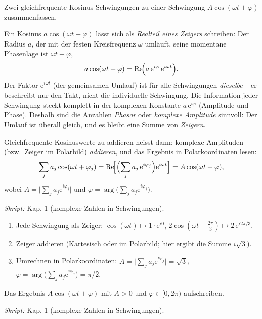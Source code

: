 

Zwei gleichfrequente Kosinus-Schwingungen zu einer Schwingung
$A\cos(\omega t+\varphi)$ zusammenfassen.

\begin{werkzeugkasten}
Ein Kosinus $a\cos(\omega t+\varphi)$ lässt sich als \emph{Realteil eines
Zeigers} schreiben: Der Radius $a$, der mit der festen Kreisfrequenz
$\omega$ umläuft, seine momentane Phasenlage ist $\omega t+\varphi$,
\begin{equation*}
  a\cos(\omega t+\varphi)
  =\operatorname{Re}\!\Bigl(a\,\mathrm e^{i\varphi}\,\mathrm e^{i\omega t}\Bigr).
\end{equation*}
Der Faktor $\mathrm e^{i\omega t}$ (der gemeinsamen Umlauf) ist für alle
Schwingungen \emph{dieselbe} -- er beschreibt nur den Takt, nicht die
individuelle Schwingung. Die Information jeder Schwingung steckt komplett
in der komplexen Konstante $a\,\mathrm e^{i\varphi}$ (Amplitude und
Phase). Deshalb sind die Anzahlen \emph{Phasor} oder \emph{komplexe Amplitude}
sinnvoll: Der Umlauf ist überall gleich, und es bleibt eine Summe von
\emph{Zeigern}.

Gleichfrequente Kosinuswerte zu addieren heisst dann: komplexe Amplituden
(bzw.\ Zeiger im Polarbild) \emph{addieren}, und das Ergebnis in
Polarkoordinaten lesen:
\begin{equation*}
  \sum_j a_j\cos(\omega t+\varphi_j)
  =\operatorname{Re}\!\Bigl[\Bigl(\sum_j a_j\,\mathrm e^{i\varphi_j}\Bigr)
  \mathrm e^{i\omega t}\Bigr]
  =A\cos(\omega t+\varphi),
\end{equation*}
wobei $A=\bigl|\sum_j a_j\mathrm e^{i\varphi_j}\bigr|$ und
$\varphi=\arg\!\bigl(\sum_j a_j\mathrm e^{i\varphi_j}\bigr)$.

\textit{Skript:} Kap. 1 (komplexe Zahlen in Schwingungen).
\end{werkzeugkasten}

\begin{werkzeugkasten}
\begin{enumerate}
  \item Jede Schwingung als Zeiger: $\cos(\omega t)\mapsto 1\cdot
        \mathrm e^{i0}$, $2\cos(\omega t+\frac{2\pi}{3})\mapsto
        2\,\mathrm e^{i2\pi/3}$.
  \item Zeiger addieren (Kartesisch oder im Polarbild; hier ergibt die
        Summe $i\sqrt3$).
  \item Umrechnen in Polarkoordinaten: $A=\bigl|\sum_j a_j\mathrm e^{i\varphi_j}\bigr|=\sqrt3$,
        $\varphi=\arg\bigl(\sum_j a_j\mathrm e^{i\varphi_j}\bigr)=\pi/2$.
\end{enumerate}
Das Ergebnis $A\cos(\omega t+\varphi)$ mit $A>0$ und
$\varphi\in[0,2\pi)$ aufschreiben.

\textit{Skript:} Kap. 1 (komplexe Zahlen in Schwingungen).
\end{werkzeugkasten}

